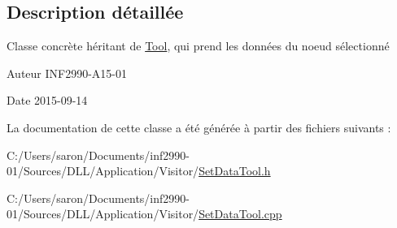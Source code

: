 \subsection{Description détaillée}
Classe concrète héritant de \hyperlink{class_tool}{Tool}, qui prend les données du noeud sélectionné 

\begin{DoxyAuthor}{Auteur}
I\-N\-F2990-\/\-A15-\/01 
\end{DoxyAuthor}
\begin{DoxyDate}{Date}
2015-\/09-\/14 
\end{DoxyDate}


La documentation de cette classe a été générée à partir des fichiers suivants \-:\begin{DoxyCompactItemize}
\item 
C\-:/\-Users/saron/\-Documents/inf2990-\/01/\-Sources/\-D\-L\-L/\-Application/\-Visitor/\hyperlink{_set_data_tool_8h}{Set\-Data\-Tool.\-h}\item 
C\-:/\-Users/saron/\-Documents/inf2990-\/01/\-Sources/\-D\-L\-L/\-Application/\-Visitor/\hyperlink{_set_data_tool_8cpp}{Set\-Data\-Tool.\-cpp}\end{DoxyCompactItemize}
